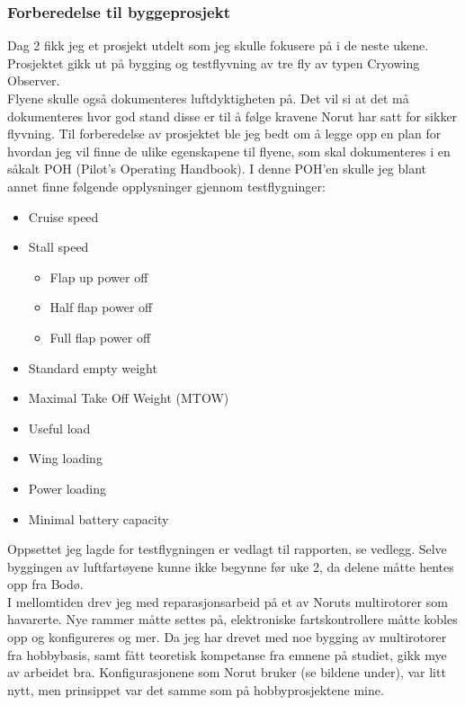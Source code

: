 \documentclass[12pt, a4paper]{article}
\begin{document}
\subsubsection{Forberedelse til byggeprosjekt}
Dag 2 fikk jeg et prosjekt utdelt som jeg skulle fokusere på i de neste ukene. Prosjektet gikk ut på bygging og testflyvning av tre fly av typen Cryowing Observer. \\
Flyene skulle også dokumenteres luftdyktigheten på. Det vil si at det må dokumenteres hvor god stand disse er til å følge kravene Norut har satt for sikker flyvning. Til forberedelse av prosjektet ble jeg bedt om å legge opp en plan for hvordan jeg vil finne de ulike egenskapene til flyene, som skal dokumenteres i en såkalt POH (Pilot's Operating Handbook). I denne POH'en skulle jeg blant annet finne følgende opplysninger gjennom testflygninger: 
\begin{itemize}
	\item Cruise speed
	\item Stall speed
	\begin{itemize}
		\item Flap up power off
		\item Half flap power off
		\item Full flap power off	
	\end{itemize}
	\item Standard empty weight
	\item Maximal Take Off Weight (MTOW)
	\item Useful load
	\item Wing loading
	\item Power loading
	\item Minimal battery capacity
\end{itemize}
Oppsettet jeg lagde for testflygningen er vedlagt til rapporten, se vedlegg. 
Selve byggingen av luftfartøyene kunne ikke begynne før uke 2, da delene måtte hentes opp fra Bodø. \\ 
\newpage
I mellomtiden drev jeg med reparasjonsarbeid på et av Noruts multirotorer som havarerte. Nye rammer måtte settes på, elektroniske fartskontrollere måtte kobles opp og konfigureres og mer. Da jeg har drevet med noe bygging av multirotorer fra hobbybasis, samt fått teoretisk kompetanse fra emnene på studiet, gikk mye av arbeidet bra. Konfigurasjonene som Norut bruker (se bildene under), var litt nytt, men prinsippet var det samme som på hobbyprosjektene mine. \\
\end{document}

